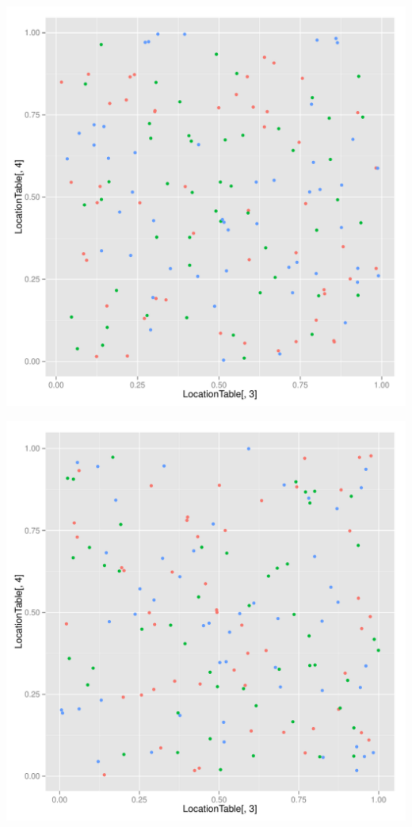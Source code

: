 \documentclass{article}\usepackage[]{graphicx}\usepackage[]{color}
\makeatletter
\def\maxwidth{ %
  \ifdim\Gin@nat@width>\linewidth
    \linewidth
  \else
    \Gin@nat@width
  \fi
}
\newenvironment{knitrout}{}{} %
\makeatother
\begin{document}
\begin{knitrout}
\includegraphics[width=\maxwidth]{figure/unnamed-chunk-2-4} 

\includegraphics[width=\maxwidth]{figure/unnamed-chunk-2-5} 


\end{knitrout}
\end{document}
